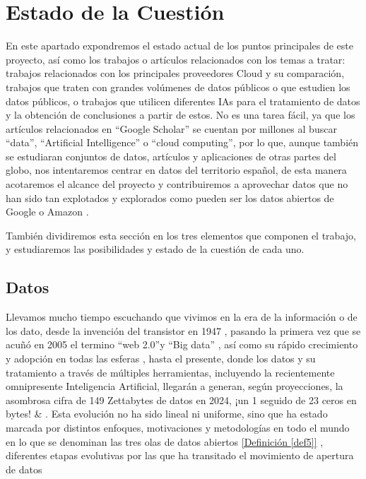 \chapter{Estado de la Cuestión}
\label{cap:estadoDeLaCuestion}


\vspace{1cm}

En este apartado expondremos el estado actual de los puntos principales de este proyecto, así como los trabajos o artículos relacionados con los temas a tratar: trabajos relacionados con los principales proveedores Cloud y su comparación, trabajos que traten con grandes volúmenes de datos públicos o que estudien los datos públicos, o trabajos que utilicen diferentes IAs para el tratamiento de datos y la obtención de conclusiones a partir de estos. No es una tarea fácil, ya que los artículos relacionados en ``Google Scholar'' se cuentan por millones al buscar ``data'', ``Artificial Intelligence'' o ``cloud computing'', por lo que, aunque también se estudiaran conjuntos de datos, artículos y aplicaciones de otras partes del globo, nos intentaremos centrar en datos del territorio español, de esta manera acotaremos el alcance del proyecto y contribuiremos a aprovechar datos que no han sido tan explotados y explorados como pueden ser los datos abiertos de Google \citep{googleDataCommon} o Amazon \citep{AWSDataCommon}. 

También dividiremos esta sección en los tres elementos que componen el trabajo, y estudiaremos las posibilidades y estado de la cuestión de cada uno. \newpage

\section{Datos}
\label{sec:EstudiosDatos}

Llevamos mucho tiempo escuchando que vivimos en la era de la información o de los dato, desde la invención del transistor en 1947 \citep{wikiInformationAge}, pasando la primera vez que se acuñó en 2005 el termino ``web 2.0''y ``Big data'' \citep{HistoryOfBigData}, así como su rápido crecimiento y adopción en todas las esferas \citep{brown2011you}, hasta el presente, donde los datos y su tratamiento a través de múltiples herramientas, incluyendo la recientemente omnipresente Inteligencia Artificial, llegarán a generan, según proyecciones, la asombrosa cifra de 149 Zettabytes de datos en 2024, ¡un 1 seguido de 23 ceros en bytes! \citep{BigDataStatista} \& \citep{BigDataStadisticsMarket}. Esta evolución no ha sido lineal ni uniforme, sino que ha estado marcada por distintos enfoques, motivaciones y metodologías en todo el mundo en lo que se denominan las tres olas de datos abiertos \hyperref[def5]{[Definición \ref*{def5}]} , diferentes etapas evolutivas por las que ha transitado el movimiento de apertura de datos

